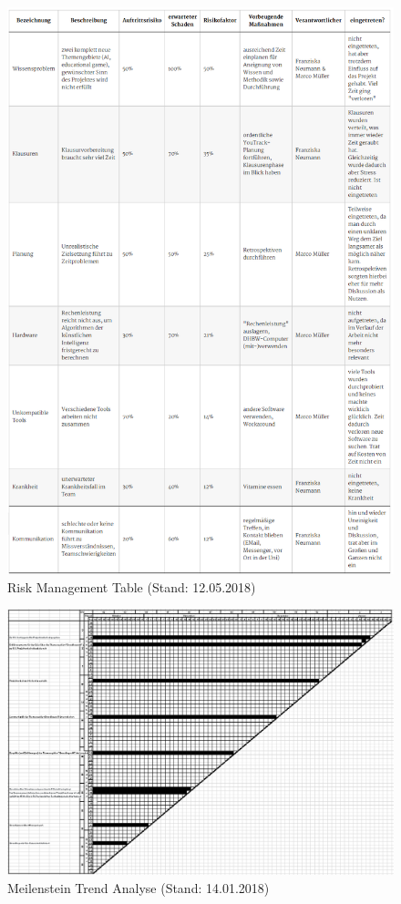 \begin{figure}[ht]
\centering
\includegraphics[scale=0.55]{bilder/RiskManagementTable.PNG}
\caption{Risk Management Table (Stand: 12.05.2018)}
\label{RiskManagementBild}
\end{figure}

\begin{figure}
\centering
\includegraphics[scale=0.6]{bilder/MTA.PNG}
\caption{Meilenstein Trend Analyse (Stand: 14.01.2018)}
\label{MTA}
\end{figure}

